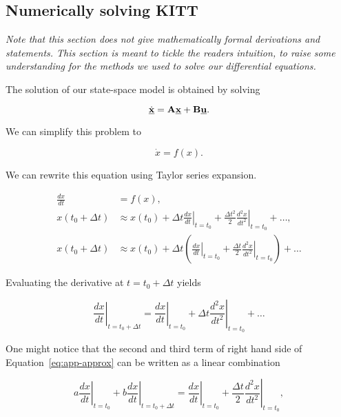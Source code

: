 \documentclass[11pt,titlepage]{report}
\begin{document}
\begin{appendices}
\chapter{Numerically solving KITT}

\textit{Note that this section does not give mathematically formal derivations and statements. This section is meant to tickle the readers intuition, to raise some understanding for the methods we used to solve our differential equations.}

The solution of our state-space model is obtained by solving

\begin{equation}
	\dot{\mathbf{\underline{x}}}=\mathbf{A}\mathbf{\underline{x}}+\mathbf{B}\mathbf{\underline{u}}.
\end{equation}

We can simplify this problem to 

\begin{equation}
	\dot{x}=f(x).
\end{equation}

We can rewrite this equation using Taylor series expansion.

\begin{align}
	\frac{dx}{dt} &= f(x), \\
	x(t_0+\Delta t) &\approx
		x(t_0)+
		\left. \Delta t \frac{dx}{dt} \right|_{t=t_0}+
		\frac{\Delta t^2}{2}\left. \frac{d^2x}{dt^2} \right|_{t=t_0}+
		\dots, \\
	x(t_0+\Delta t) &\approx
		x(t_0)+
		\Delta t \left(
			\left. \frac{dx}{dt} \right|_{t=t_0}+
			\frac{\Delta t}{2}\left. \frac{d^2x}{dt^2} \right|_{t=t_0}
		\right) + \dots \label{eq:app-approx}
\end{align}

Evaluating the derivative at $t=t_0+\Delta t$ yields

\begin{equation}
	\left. \frac{dx}{dt} \right|_{t=t_0+\Delta t} = 
		\left. \frac{dx}{dt} \right|_{t=t_0} +
		\Delta t \left. \frac{d^2x}{dt^2} \right|_{t=t_0} + \dots
\end{equation}

One might notice that the second and third term of right hand side of Equation~\ref{eq:app-approx} can be written as a linear combination

\begin{equation}
	a \left. \frac{dx}{dt} \right|_{t=t_0} +
	b \left. \frac{dx}{dt} \right|_{t=t_0+\Delta t} =
		\left. \frac{dx}{dt} \right|_{t=t_0}+
		\frac{\Delta t}{2}\left. \frac{d^2x}{dt^2} \right|_{t=t_0},
\end{equation}


\end{appendices}
\end{document}
